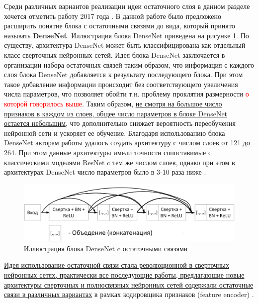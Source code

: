 \documentclass[12pt]{article}
\begin{document}
\begin{sloppypar}
Среди различных вариантов реализации идеи остаточного слоя в данном разделе хочется отметить работу 2017 года \cite{huang2017densely}. В данной работе было предложено расширить понятие блока с остаточными связями до вида, который принято называть \textbf{DenseNet}. Иллюстрация блока DenseNet приведена на рисунке \ref{ch1:fig:densenet}. По существу,  архитектура DenseNet может быть классифицирована как отдельный класс сверточных нейронных сетей. Идея блока DenseNet заключается в организации набора остаточных связей таким образом, что информация с каждого слоя блока DenseNet добавляется к результату последующего блока. При этом такое добавление информации происходит без соответствующего увеличения числа параметров, что позволяет обойти т.н. проблему проклятия размерности \textcolor{red}{о которой говорилось выше}. Таким образом, \uline{не смотря на большое число признаков в каждом из слоев, общее число параметров в блоке DenseNet остается небольшим}, что дополнительно снижает вероятность переобучения нейронной сети и ускоряет ее обучение. Благодаря использованию блока DenseNet авторам работы \cite{huang2017densely} удалось создать архитектуру с числом слоев от 121 до 264. При этом данные архитектуры имели точности сопоставимые с классическими моделями ResNet c тем же числом слоев, однако при этом в архитектурах DenseNet число параметров было в 3-10 раза ниже \cite{huang2017densely}.

\begin{figure}[!h]
	\begin{center}
		\includegraphics[width=0.99\linewidth]{./figuresch1/densenet.png}
		\caption{Иллюстрация блока DenseNet c остаточными связями}		
		\label{ch1:fig:densenet}
	\end{center}
\end{figure}

\uline{Идея использование остаточной связи стала революционной в сверточных нейронных сетях, практически все последующие работы, предлагающие новые архитектуры сверточных и полносвязных нейронных сетей содержали остаточные связи в различных вариантах} в рамках кодировщика признаков (feature encoder) \cite{khan2020survey}. 


\end{sloppypar}
\end{document}
